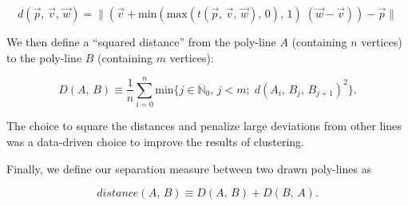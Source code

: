 \documentclass[../main.tex]{subfiles}
\begin{document}
\begin{equation}
d(\vec{p},\,\vec{v},\,\vec{w}) = \|\left(\vec{v} + \mathrm{min}(\mathrm{max}(t(\vec{p},\,\vec{v},\,\vec{w}),\, 0),\, 1)\;(\vec{w} - \vec{v})\right) - \vec{p}\|
\end{equation}

We then define a ``squared distance'' from the poly-line $A$ (containing $n$ vertices) to the poly-line $B$ (containing $m$ vertices):

\begin{equation}
D(A,\,B) \equiv \frac{1}{n}\sum_{i = 0}^{n} \mathrm{min}\{j \in \mathbb{N}_0,\, j < m;\; d(A_i,\, B_j,\, B_{j+1})^2\}.
\end{equation}

The choice to square the distances and penalize large deviations from other lines was a data-driven choice to improve the results of clustering.

Finally, we define our separation measure between two drawn poly-lines as

\begin{equation}
distance(A,\,B) \equiv D(A,\,B) + D(B,\,A).
\end{equation}
\end{document}

